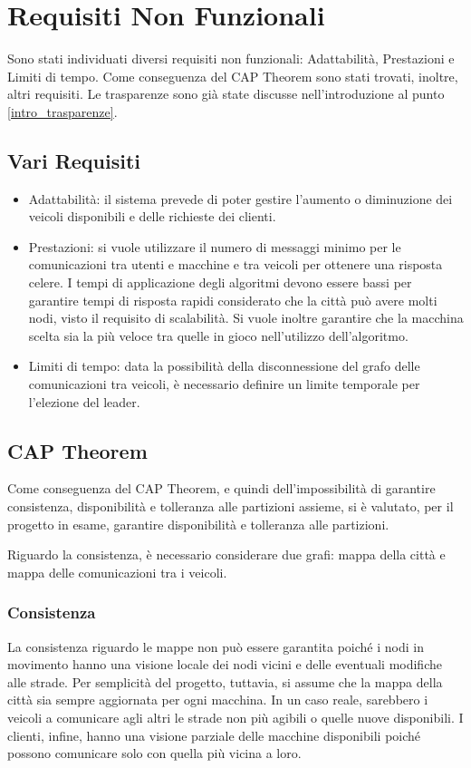 \section{Requisiti Non Funzionali} \label{requisiti_non_funzionali}
Sono stati individuati diversi requisiti non funzionali: Adattabilità, Prestazioni e Limiti di tempo. Come conseguenza del CAP Theorem sono stati trovati, inoltre, altri requisiti.
Le trasparenze sono già state discusse nell'introduzione al punto \ref{intro_trasparenze}.

\subsection{Vari Requisiti}
\begin{itemize}
	\item Adattabilità: il sistema prevede di poter gestire l'aumento o diminuzione dei veicoli disponibili e delle richieste dei clienti.
	\item Prestazioni: si vuole utilizzare il numero di messaggi minimo per le comunicazioni tra utenti e macchine e tra veicoli per ottenere una risposta celere. I tempi di applicazione degli algoritmi devono essere bassi per garantire tempi di risposta rapidi considerato che la città può avere molti nodi, visto il requisito di scalabilità. Si vuole inoltre garantire che la macchina scelta sia la più veloce tra quelle in gioco nell'utilizzo dell'algoritmo.
	\item Limiti di tempo: data la possibilità della disconnessione del grafo delle comunicazioni tra veicoli, è necessario definire un limite temporale per l'elezione del leader.
\end{itemize}

\subsection{CAP Theorem}
Come conseguenza del CAP Theorem, e quindi dell'impossibilità di garantire consistenza, disponibilità e tolleranza alle partizioni assieme, si è valutato, per il progetto in esame, garantire disponibilità e tolleranza alle partizioni.

Riguardo la consistenza, è necessario considerare due grafi: mappa della città e mappa delle comunicazioni tra i veicoli. 

\subsubsection{Consistenza}
La consistenza riguardo le mappe non può essere garantita poiché i nodi in movimento hanno una visione locale dei nodi vicini e delle eventuali modifiche alle strade. Per semplicità del progetto, tuttavia, si assume che la mappa della città sia sempre aggiornata per ogni macchina. In un caso reale, sarebbero i veicoli a comunicare agli altri le strade non più agibili o quelle nuove disponibili. I clienti, infine, hanno una visione parziale delle macchine disponibili poiché possono comunicare solo con quella più vicina a loro.

